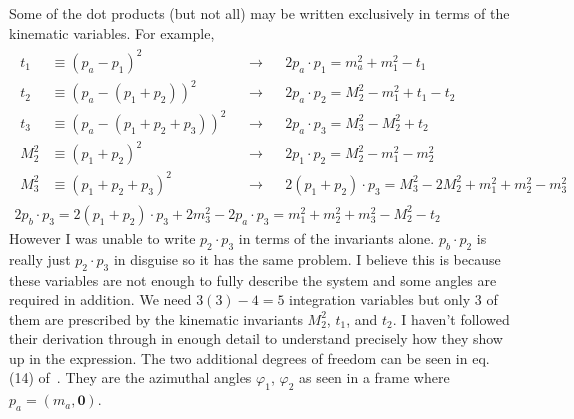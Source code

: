 
Some of the dot products (but not all) may be written exclusively in terms of the kinematic variables. For example,
\begin{gather*}
    \begin{align*}
        t_1 &\equiv (p_a - p_1)^2 &&\rightarrow 
        && 2 p_a \cdot p_1 = m_a^2 +  m_1^2 - t_1 \\
        t_2 &\equiv (p_a - (p_1 + p_2))^2 &&\rightarrow 
        && 2 p_a \cdot p_2 = M_2^2 - m_1^2 + t_1 - t_2 \\
        t_3 &\equiv (p_a - (p_1 + p_2 + p_3))^2 &&\rightarrow 
        && 2 p_a \cdot p_3 = M_3^2 - M_2^2 + t_2 \\
        M_2^2 &\equiv (p_1 + p_2)^2 &&\rightarrow 
        && 2 p_1 \cdot p_2 = M_2^2 - m_1^2 - m_2^2 \\
        M_3^2 &\equiv (p_1 + p_2 + p_3)^2 &&\rightarrow 
        && 2 (p_1 + p_2) \cdot p_3 = M_3^2 - 2 M_2^2 + m_1^2 + m_2^2 - m_3^2 
    \end{align*}\\
    2 p_b \cdot p_3 = 2 (p_1 + p_2) \cdot p_3 + 2 m_3^2  - 2 p_a \cdot p_3 =
    m_1^2 + m_2^2 + m_3^2 - M_2^2 - t_2
\end{gather*}
However I was unable to write $p_2 \cdot p_3$ in terms of the invariants alone. 
$p_b \cdot p_2$ is really just $p_2 \cdot p_3$ in disguise so it has the same problem.
I believe this is because these variables are not enough to fully describe the system and some angles are required in addition. 
We need $3(3) - 4 = 5$ integration variables but only $3$ of them are prescribed by the kinematic invariants $M_2^2$, $t_1$, and $t_2$\footnotemark.
I haven't followed their derivation through in enough detail to understand precisely how they show up in the expression.
The two additional degrees of freedom can be seen in eq. (14) of~\cite{Byckling:1969sx}. 
They are the azimuthal angles $\varphi_1$, $\varphi_2$ as seen in a frame where $p_a = (m_a, \bm{0})$.   



